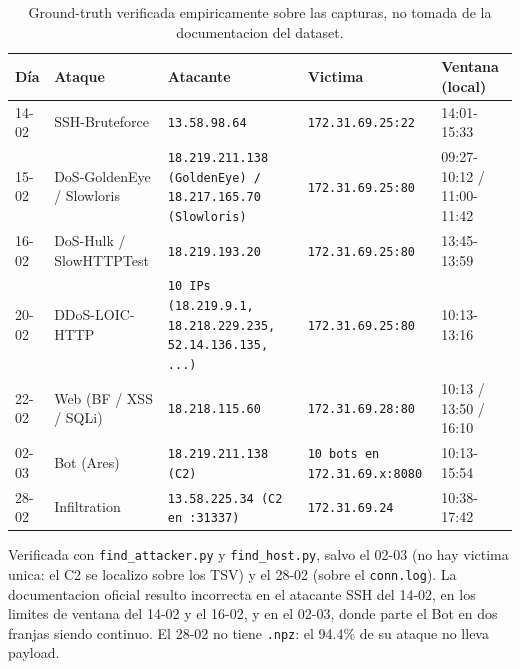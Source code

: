 \begin{table}[htbp]
  \centering
  \caption{Ground-truth verificada empiricamente sobre las capturas, no tomada de la documentacion del dataset.}
  \label{tab:gt}
  \footnotesize
  \begin{tabular}{lllll}
    \toprule
    \textbf{Día} & \textbf{Ataque} & \textbf{Atacante} & \textbf{Victima} & \textbf{Ventana (local)} \\
    \midrule
    14-02 & SSH-Bruteforce & \texttt{13.58.98.64} & \texttt{172.31.69.25:22} & 14:01-15:33 \\
    15-02 & DoS-GoldenEye / Slowloris & \texttt{18.219.211.138 (GoldenEye) / 18.217.165.70 (Slowloris)} & \texttt{172.31.69.25:80} & 09:27-10:12 / 11:00-11:42 \\
    16-02 & DoS-Hulk / SlowHTTPTest & \texttt{18.219.193.20} & \texttt{172.31.69.25:80} & 13:45-13:59 \\
    20-02 & DDoS-LOIC-HTTP & \texttt{10 IPs (18.219.9.1, 18.218.229.235, 52.14.136.135, ...)} & \texttt{172.31.69.25:80} & 10:13-13:16 \\
    22-02 & Web (BF / XSS / SQLi) & \texttt{18.218.115.60} & \texttt{172.31.69.28:80} & 10:13 / 13:50 / 16:10 \\
    02-03 & Bot (Ares) & \texttt{18.219.211.138 (C2)} & \texttt{10 bots en 172.31.69.x:8080} & 10:13-15:54 \\
    28-02 & Infiltration & \texttt{13.58.225.34 (C2 en :31337)} & \texttt{172.31.69.24} & 10:38-17:42 \\
    \bottomrule
  \end{tabular}
  \par\smallskip\footnotesize{Verificada con \texttt{find\_attacker.py} y \texttt{find\_host.py}, salvo el 02-03 (no hay victima unica: el C2 se localizo sobre los TSV) y el 28-02 (sobre el \texttt{conn.log}). La documentacion oficial resulto incorrecta en el atacante SSH del 14-02, en los limites de ventana del 14-02 y el 16-02, y en el 02-03, donde parte el Bot en dos franjas siendo continuo. El 28-02 no tiene \texttt{.npz}: el 94.4\% de su ataque no lleva payload.}
\end{table}
